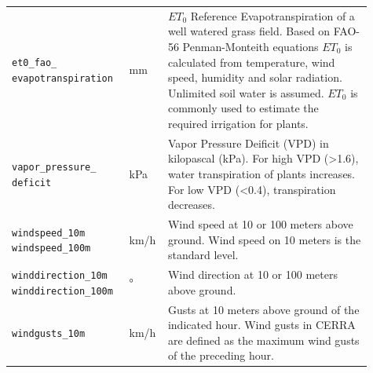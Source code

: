 \begin{longtable}[c]{p{0.3\linewidth}|p{0.07\linewidth}| p{0.54\linewidth}}
	\verb|et0_fao_| \verb|evapotranspiration|                                                                                                                                               & mm                      & $ET_0$ Reference Evapotranspiration of a well watered grass field. Based on FAO-56 Penman-Monteith equations $ET_0$ is calculated from temperature, wind speed, humidity and solar radiation. Unlimited soil water is assumed. $ET_0$ is commonly used to estimate the required irrigation for plants. \\
	\verb|vapor_pressure_| \verb|deficit|                                                                                                                                                   & kPa                     & Vapor Pressure Deificit (VPD) in kilopascal (kPa). For high VPD (>1.6), water transpiration of plants increases. For low VPD (<0.4), transpiration decreases.                                                                                                                                          \\
	\verb|windspeed_10m| \verb|windspeed_100m|                                                                                                                                              & km/h                    & Wind speed at 10 or 100 meters above ground. Wind speed on 10 meters is the standard level.                                                                                                                                                                                                            \\
	\verb|winddirection_10m| \verb|winddirection_100m|                                                                                                                                      & °                       & Wind direction at 10 or 100 meters above ground.                                                                                                                                                                                                                                                       \\
	\verb|windgusts_10m |                                                                                                                                                                   & km/h                    & Gusts at 10 meters above ground of the indicated hour. Wind gusts in CERRA are defined as the maximum wind gusts of the preceding hour.                                                                                                                                                                \\ %

\end{longtable}
